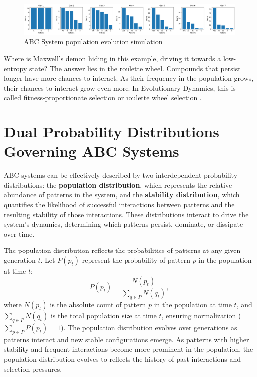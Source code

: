 \documentclass[entropy,article,submit,pdftex,moreauthors]{Definitions/mdpi}
\begin{document}
\begin{figure}[htp]
    \centering
    \includegraphics[width=13cm]{pat_1}
    \caption{ABC System population evolution simulation}
    \label{fig:pat_1}
\end{figure}

Where is Maxwell's demon \cite{leff2002maxwell} hiding in this example, driving it towards a low-entropy state? The answer lies in the roulette wheel. Compounds that persist longer have more chances to interact. As their frequency in the population grows, their chances to interact grow even more. In Evolutionary Dynamics, this is called fitness-proportionate selection \cite{back1996evolutionary} or roulette wheel selection \cite{goldberg1989genetic} \cite{holland1975adaptation}.

\section{Dual Probability Distributions Governing ABC Systems}

ABC systems can be effectively described by two interdependent probability distributions: the \textbf{population distribution}, which represents the relative abundance of patterns in the system, and the \textbf{stability distribution}, which quantifies the likelihood of successful interactions between patterns and the resulting stability of those interactions. These distributions interact to drive the system's dynamics, determining which patterns persist, dominate, or dissipate over time.

The population distribution reflects the probabilities of patterns at any given generation \( t \). Let \( P(p_t) \) represent the probability of pattern \( p \) in the population at time \( t \):
\[
P(p_t) = \frac{N(p_t)}{\sum_{q \in P} N(q_t)},
\]
where \( N(p_t) \) is the absolute count of pattern \( p \) in the population at time \( t \), and \( \sum_{q \in P} N(q_t) \) is the total population size at time \( t \), ensuring normalization (\( \sum_{p \in P} P(p_t) = 1 \)). The population distribution evolves over generations as patterns interact and new stable configurations emerge. As patterns with higher stability and frequent interactions become more prominent in the population, the population distribution evolves to reflects the history of past interactions and selection pressures.
\end{document}

